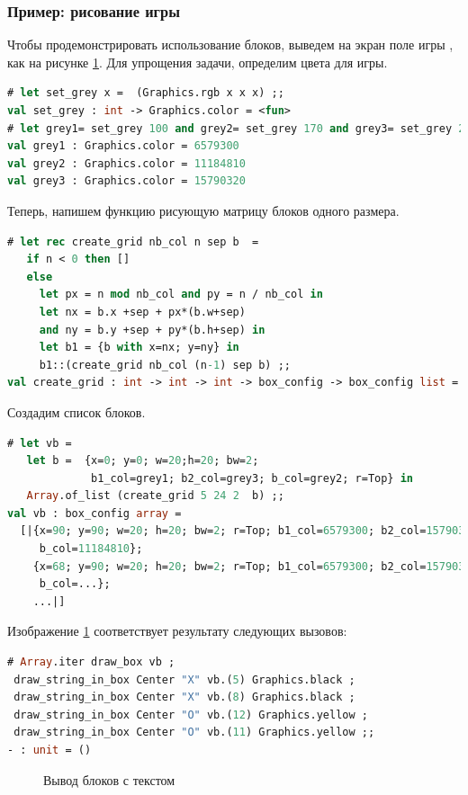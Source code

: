 \subsubsection{Пример: рисование игры}

Чтобы продемонстрировать использование блоков, выведем на экран поле игры 
, как на рисунке \ref{fig:displaying_of_boxes_with_text}. 
Для упрощения задачи, определим цвета для игры.

\begin{lstlisting}[language=OCaml]
# let set_grey x =  (Graphics.rgb x x x) ;;
val set_grey : int -> Graphics.color = <fun>
# let grey1= set_grey 100 and grey2= set_grey 170 and grey3= set_grey 240 ;;
val grey1 : Graphics.color = 6579300
val grey2 : Graphics.color = 11184810
val grey3 : Graphics.color = 15790320
\end{lstlisting}

Теперь, напишем функцию рисующую матрицу блоков одного размера. 

\begin{lstlisting}[language=OCaml]
# let rec create_grid nb_col n sep b  =
   if n < 0 then []
   else 
     let px = n mod nb_col and py = n / nb_col in
     let nx = b.x +sep + px*(b.w+sep)
     and ny = b.y +sep + py*(b.h+sep) in
     let b1 = {b with x=nx; y=ny} in
     b1::(create_grid nb_col (n-1) sep b) ;;
val create_grid : int -> int -> int -> box_config -> box_config list = <fun>
\end{lstlisting}

Создадим список блоков. 

\begin{lstlisting}[language=OCaml]
# let vb = 
   let b =  {x=0; y=0; w=20;h=20; bw=2;
             b1_col=grey1; b2_col=grey3; b_col=grey2; r=Top} in 
   Array.of_list (create_grid 5 24 2  b) ;;
val vb : box_config array =
  [|{x=90; y=90; w=20; h=20; bw=2; r=Top; b1_col=6579300; b2_col=15790320;
     b_col=11184810};
    {x=68; y=90; w=20; h=20; bw=2; r=Top; b1_col=6579300; b2_col=15790320;
     b_col=...};
    ...|]
\end{lstlisting}

Изображение \ref{fig:displaying_of_boxes_with_text} соответствует результату 
следующих вызовов:

\begin{lstlisting}[language=OCaml]
# Array.iter draw_box vb ;
 draw_string_in_box Center "X" vb.(5) Graphics.black ;
 draw_string_in_box Center "X" vb.(8) Graphics.black ;
 draw_string_in_box Center "O" vb.(12) Graphics.yellow ;
 draw_string_in_box Center "O" vb.(11) Graphics.yellow ;;
- : unit = ()
\end{lstlisting}

\begin{figure}[h]
	\caption{\label{fig:displaying_of_boxes_with_text}Вывод блоков с текстом}
\end{figure}

